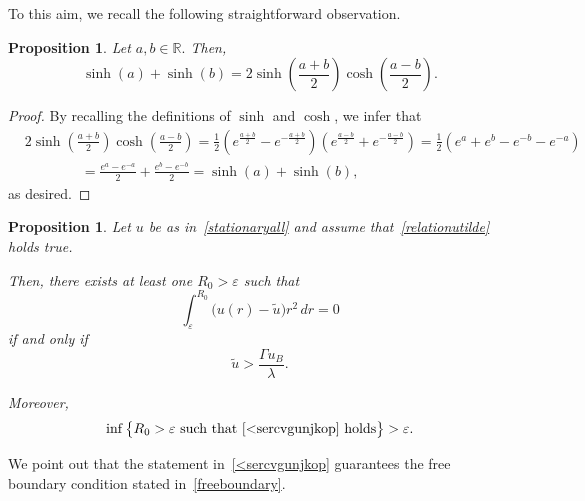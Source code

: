 \documentclass[12pt,a4paper,intlimits,sumlimits]{amsart}
\def \R {\mathbb{R}}
\theoremstyle{definition}
\theoremstyle{plain}
\newtheorem{proposition}[definition]{Proposition}
\numberwithin{equation}{section}
\begin{document}
To this aim, we recall the following straightforward observation.

\begin{proposition}\label{Proplèpkmoò.,lmkbhul,ò.à-}
Let $a, b\in\R.$ Then,
\[
\sinh(a) +\sinh(b) = 2\sinh\left(\frac{a+b}{2}\right)\cosh\left(\frac{a-b}{2}\right).
\]
\end{proposition}

\begin{proof}
By recalling the definitions of $\sinh$ and $\cosh$, we infer that
\[
\begin{split}&
2\sinh\left(\frac{a+b}{2}\right)\cosh\left(\frac{a-b}{2}\right) =\frac12 (e^{\frac{a+b}{2}}-e^{-\frac{a+b}{2}})(e^{\frac{a-b}{2}}+e^{-\frac{a-b}{2}})=\frac12(e^a +e^b-e^{-b}-e^{-a})\\
&\qquad\qquad= \frac{e^a -e^{-a}}{2} +\frac{e^b -e^{-b}}{2} =\sinh(a) +\sinh(b),
\end{split}
\]
as desired.
\end{proof}

\begin{proposition}\label{propabcsPI}
Let $u$ be as in~\eqref{stationaryall} and assume that~\eqref{relationutilde} holds true. 

Then, there exists at least one $R_0>\varepsilon$ such that
\begin{equation}\label{<sercvgunjkop}
\int_\varepsilon^{R_0}\big(u(r)-\widetilde u\big)r^2\,dr=0
\end{equation}
if and only if 
\begin{equation}\label{kjinkmjnbhkmjbhkm,mjhukol8hbuijnklmò9}
\widetilde u >\frac{\Gamma u_B}{\lambda}.
\end{equation}

Moreover,
\begin{equation}\label{drftguhikl}
\inf\big\{R_0>\varepsilon \mbox{ such that $\eqref{<sercvgunjkop}$ holds}\big\}>\varepsilon.
\end{equation}
\end{proposition}

We point out that the statement in~\eqref{<sercvgunjkop} guarantees the
free boundary condition stated in~\eqref{freeboundary}.
\end{document}
